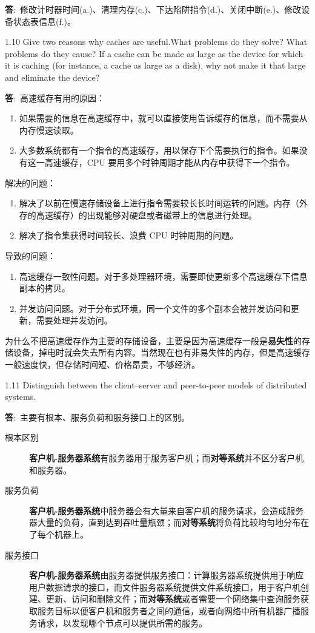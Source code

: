 \documentclass[12pt,a4paper]{article}
\newenvironment{problems}{\begin{list}{}{\renewcommand{\makelabel}[1]{\textbf{##1}\hfil}}}{\end{list}}
\providecommand{\ans}{\textbf{答}:~}
\begin{document}
\begin{problems}
    \ans 修改计时器时间(a.)、清理内存(c.)、下达陷阱指令(d.)、关闭中断(e.)、修改设备状态表信息(f.)。
    \item[1.10] Give two reasons why caches are useful.What problems do they solve?
    What problems do they cause? If a cache can be made as large as the device for which it is caching (for instance, a cache as large as a disk),
    why not make it that large and eliminate the device?

    \ans 高速缓存有用的原因：
    \begin{enumerate}
        \item 如果需要的信息在高速缓存中，就可以直接使用告诉缓存的信息，而不需要从内存慢速读取。
        \item 大多数系统都有一个指令的高速缓存，用以保存下个需要执行的指令。如果没有这一高速缓存，CPU 要用多个时钟周期才能从内存中获得下一个指令。
    \end{enumerate}

    解决的问题：
    \begin{enumerate}
        \item 解决了以前在慢速存储设备上进行指令需要较长长时间运转的问题。内存（外存的高速缓存）的出现能够对硬盘或者磁带上的信息进行处理。
        \item 解决了指令集获得时间较长、浪费 CPU 时钟周期的问题。
    \end{enumerate}

    导致的问题：
    \begin{enumerate}
        \item 高速缓存一致性问题。对于多处理器环境，需要即使更新多个高速缓存下信息副本的拷贝。
        \item 并发访问问题。对于分布式环境，同一个文件的多个副本会被并发访问和更新，需要处理并发访问。
    \end{enumerate}

    为什么不把高速缓存作为主要的存储设备，主要是因为高速缓存一般是\textbf{易失性}的存储设备，掉电时就会失去所有内容。当然现在也有非易失性的内存，但是高速缓存一般速度快，但存储时间短、价格昂贵，不够经济。
    \item[1.11] Distinguish between the client–server and peer-to-peer models of distributed
    systems.

    \ans 主要有根本、服务负荷和服务接口上的区别。
    \begin{description}
        \item[根本区别] \textbf{客户机-服务器系统}有服务器用于服务客户机；而\textbf{对等系统}并不区分客户机和服务器。
        \item[服务负荷] \textbf{客户机-服务器系统}中服务器会有大量来自客户机的服务请求，会造成服务器大量的负荷，直到达到吞吐量瓶颈；而\textbf{对等系统}将负荷比较均匀地分布在了每个机器上。
        \item[服务接口] \textbf{客户机-服务器系统}由服务器提供服务接口：计算服务器系统提供用于响应用户数据请求的接口，而文件服务器系统提供文件系统接口，用于客户机创建、更新、访问和删除文件；而\textbf{对等系统}或者需要一个网络集中查询服务获取服务目标以便客户机和服务者之间的通信，或者向网络中所有机器广播服务请求，以发现哪个节点可以提供所需的服务。
    \end{description}
    

\end{problems}
\end{document}
